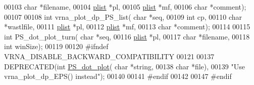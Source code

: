 \begin{DoxyCode}
00103                       \textcolor{keywordtype}{char} *filename,
00104                       \hyperlink{group__struct__utils__plist_structvrna__elem__prob__s}{plist} *pl,
00105                       \hyperlink{group__struct__utils__plist_structvrna__elem__prob__s}{plist} *mf,
00106                       \textcolor{keywordtype}{char} *comment);
00107 
00108 \textcolor{keywordtype}{int} vrna\_plot\_dp\_PS\_list( \textcolor{keywordtype}{char} *seq,
00109                           \textcolor{keywordtype}{int} cp,
00110                           \textcolor{keywordtype}{char} *wastlfile,
00111                           \hyperlink{group__struct__utils__plist_structvrna__elem__prob__s}{plist} *pl,
00112                           \hyperlink{group__struct__utils__plist_structvrna__elem__prob__s}{plist} *mf,
00113                           \textcolor{keywordtype}{char} *comment);
00114 
00115 \textcolor{keywordtype}{int} PS\_dot\_plot\_turn( \textcolor{keywordtype}{char} *seq,
00116                       \hyperlink{group__struct__utils__plist_structvrna__elem__prob__s}{plist} *pl,
00117                       \textcolor{keywordtype}{char} *filename,
00118                       \textcolor{keywordtype}{int} winSize);
00119 
00120 \textcolor{preprocessor}{#ifndef VRNA\_DISABLE\_BACKWARD\_COMPATIBILITY}
00121 
00137 DEPRECATED(\textcolor{keywordtype}{int} \hyperlink{group__plotting__utils_ga689a97a7e3b8a2df14728b8204d9d57b}{PS\_dot\_plot}( \textcolor{keywordtype}{char} *\textcolor{keywordtype}{string},
00138                             \textcolor{keywordtype}{char} *file),
00139 \textcolor{stringliteral}{"Use vrna\_plot\_dp\_EPS() instead"});
00140 
00141 \textcolor{preprocessor}{#endif}
00142 
00147 \textcolor{preprocessor}{#endif}
\end{DoxyCode}
